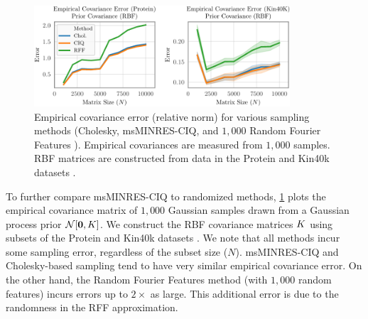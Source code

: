 \begin{figure}[ht!]
	\centering
	\includegraphics[width=0.85\textwidth]{figures/empirical_covariance_prior.pdf}
  \caption[
    Empirical covariance error for various sampling methods (Cholesky, msMINRES-CIQ, and Random Fourier Features).
  ]{
    Empirical covariance error (relative norm) for various sampling methods (Cholesky, msMINRES-CIQ, and $1,\!000$ Random Fourier Features \cite{rahimi2008random}).
    Empirical covariances are measured from $1,\!000$ samples.
    RBF matrices are constructed from data in the Protein and Kin40k datasets \cite{asuncion2007uci}.
  }
  \label{fig:empirical_covariance_matrix}
\end{figure}

To further compare msMINRES-CIQ to randomized methods, \cref{fig:empirical_covariance_matrix} plots the empirical covariance matrix of $1,\!000$ Gaussian samples drawn from a Gaussian process prior $\normaldist{\bzero}{\bK}$.
We construct the RBF covariance matrices $K$ using subsets of the Protein and Kin40k datasets \cite{asuncion2007uci}.
We note that all methods incur some sampling error, regardless of the subset size ($N$).
msMINRES-CIQ and Cholesky-based sampling tend to have very similar empirical covariance error.
On the other hand, the Random Fourier Features method \cite{rahimi2008random} (with $1,\!000$ random features) incurs errors up to $2\times$ as large.
This additional error is due to the randomness in the RFF approximation.

